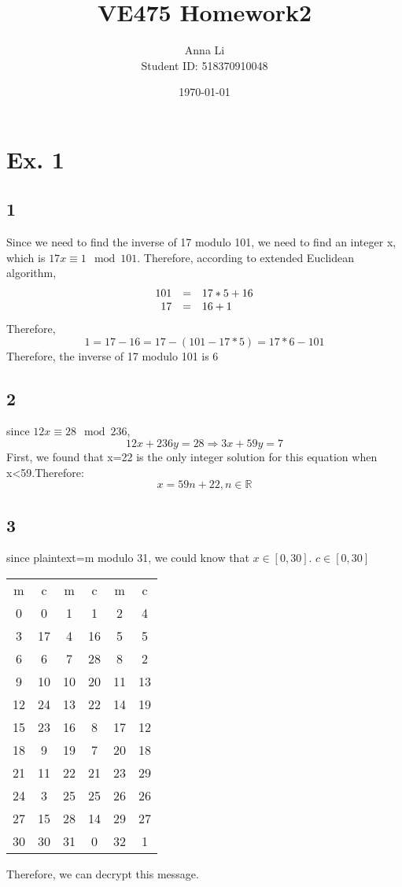 \documentclass[a4paper,12pt]{journal}
\title{VE475 Homework2}
\author{Anna Li \\Student ID: 518370910048}
\date{\today}
\begin{document}
	\maketitle
	\section*{Ex. 1}
	\subsection*{1}
	Since we need to find the inverse of 17 modulo 101, we need to find an integer x, which is $17x\equiv 1\mod 101$. Therefore, according to extended Euclidean algorithm, 
	\begin{equation}
	\begin{array}{r c l}
		101 &=& 17*5+16\\
		17&=&16+1\\
	\end{array}
	\end{equation}
Therefore,
$$1=17-16=17-(101-17*5)=17*6-101$$
Therefore, the inverse of 17 modulo 101 is 6
	\subsection*{2}
	since $12x\equiv 28\mod 236$,
	$$12x+236y=28\Rightarrow3x+59y=7$$
	First, we found that x=22 is the only integer solution for this equation when x<59.Therefore:
	$$x=59n+22,n\in\mathbb{R}$$
	\subsection*{3}
	since plaintext=m modulo 31, we could know that $x\in[0,30]$. $c\in[0,30]$
	\begin{center}
	\begin{tabular}{c c c c c c}
		m&c&m&c&m&c\\
		0&0&1&1&2&4\\
		3&17&4&16&5&5\\
		6&6&7&28&8&2\\
		9&10&10&20&11&13\\
		12&24&13&22&14&19\\
		15&23&16&8&17&12\\
		18&9&19&7&20&18\\
		21&11&22&21&23&29\\
		24&3&25&25&26&26\\
		27&15&28&14&29&27\\
		30&30&31&0&32&1\\
	\end{tabular}
	\end{center}
Therefore, we can decrypt this message.
\end{document}
